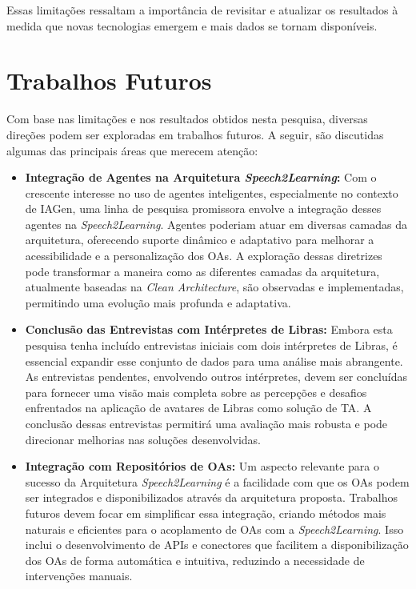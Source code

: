 Essas limitações ressaltam a importância de revisitar e atualizar os resultados à medida que novas tecnologias emergem e mais dados se tornam disponíveis.

\section{Trabalhos Futuros}

Com base nas limitações e nos resultados obtidos nesta pesquisa, diversas direções podem ser exploradas em trabalhos futuros. A seguir, são discutidas algumas das principais áreas que merecem atenção:

\begin{itemize}

    \item \textbf{Integração de Agentes na Arquitetura \textit{Speech2Learning}:} Com o crescente interesse no uso de agentes inteligentes, especialmente no contexto de IAGen, uma linha de pesquisa promissora envolve a integração desses agentes na \textit{Speech2Learning}. Agentes poderiam atuar em diversas camadas da arquitetura, oferecendo suporte dinâmico e adaptativo para melhorar a acessibilidade e a personalização dos OAs. A exploração dessas diretrizes pode transformar a maneira como as diferentes camadas da arquitetura, atualmente baseadas na \textit{Clean Architecture}, são observadas e implementadas, permitindo uma evolução mais profunda e adaptativa.

    \item \textbf{Conclusão das Entrevistas com Intérpretes de Libras:} Embora esta pesquisa tenha incluído entrevistas iniciais com dois intérpretes de Libras, é essencial expandir esse conjunto de dados para uma análise mais abrangente. As entrevistas pendentes, envolvendo outros intérpretes, devem ser concluídas para fornecer uma visão mais completa sobre as percepções e desafios enfrentados na aplicação de avatares de Libras como solução de TA. A conclusão dessas entrevistas permitirá uma avaliação mais robusta e pode direcionar melhorias nas soluções desenvolvidas.

    \item \textbf{Integração com Repositórios de OAs:} Um aspecto relevante para o sucesso da Arquitetura \textit{Speech2Learning} é a facilidade com que os OAs podem ser integrados e disponibilizados através da arquitetura proposta. Trabalhos futuros devem focar em simplificar essa integração, criando métodos mais naturais e eficientes para o acoplamento de OAs com a \textit{Speech2Learning}. Isso inclui o desenvolvimento de APIs e conectores que facilitem a disponibilização dos OAs de forma automática e intuitiva, reduzindo a necessidade de intervenções manuais.


\end{itemize}
